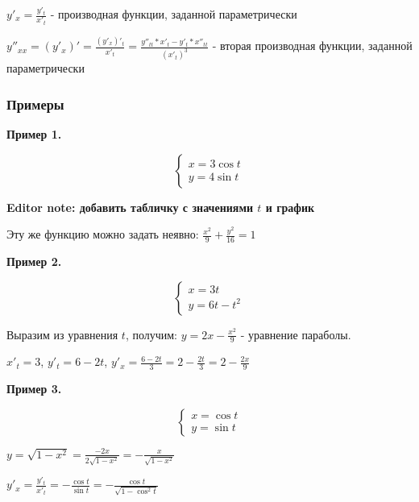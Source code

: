 \documentclass{article}
\begin{document}
\begin{flushleft}
$y'_x = \frac{y'_t}{x'_t}$ - производная функции, заданной параметрически

$y''_{xx} = (y'_x)' = \frac{(y'_x)'_t}{x'_t} = \frac{y''_{t t} * x'_t - y'_t * x''_{t t}}{(x'_t)^3}$ - вторая производная функции, заданной параметрически

\subsubsection{Примеры}

\textbf{Пример 1.}

\begin{equation}
    \begin{cases}
        x = 3 \cos t \\
        y = 4 \sin t
    \end{cases}
\end{equation}

\textbf{Editor note: добавить табличку с значениями $t$ и график}

\hfill

Эту же функцию можно задать неявно: $\frac{x^2}{9} + \frac{y^2}{16} = 1$

\hfill

\textbf{Пример 2.}

\begin{equation}
    \begin{cases}
        x = 3t \\
        y = 6t - t^2
    \end{cases}
\end{equation}

Выразим из уравнения $t$, получим: $y = 2x - \frac{x^2}{9}$ - уравнение параболы.

\hfill

$x'_t = 3$, $y'_t = 6 - 2t$, $y'_x = \frac{6 - 2t}{3} = 2 - \frac{2t}{3} = 2 - \frac{2x}{9}$

\hfill

\textbf{Пример 3.}

\begin{equation}
    \begin{cases}
        x = \cos t \\
        y = \sin t
    \end{cases}
\end{equation}

$y = \sqrt{1 - x^2} = \frac{-2x}{2\sqrt{1 - x^2}} = -\frac{x}{\sqrt{1 - x^2}}$

$y'_x = \frac{y'_t}{x'_t} = -\frac{\cos t}{\sin t} = -\frac{\cos t}{\sqrt{1 - \cos^2 t}}$


\end{flushleft}
\end{document}
